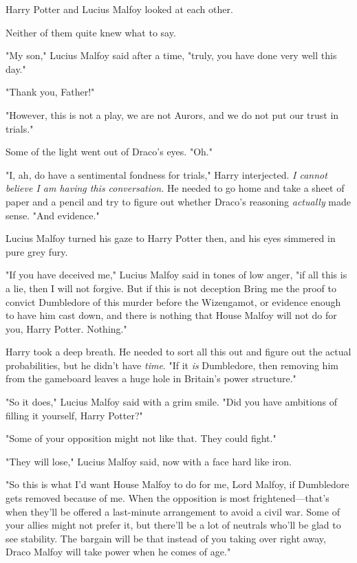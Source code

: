Harry Potter and Lucius Malfoy looked at each other.

Neither of them quite knew what to say.

"My son," Lucius Malfoy said after a time, "truly, you have done very well this
day."

"Thank you, Father!"

"However, this is not a play, we are not Aurors, and we do not put our trust in
trials."

Some of the light went out of Draco's eyes. "Oh."

"I, ah, do have a sentimental fondness for trials," Harry interjected. \emph{I
cannot believe I am having this conversation.} He needed to go home and take a
sheet of paper and a pencil and try to figure out whether Draco's reasoning
\emph{actually} made sense. "And evidence."

Lucius Malfoy turned his gaze to Harry Potter then, and his eyes simmered in
pure grey fury.

"If you have deceived me," Lucius Malfoy said in tones of low anger, "if all
this is a lie, then I will not forgive. But if this is not deception{\el}
Bring me the proof to convict Dumbledore of this murder before the Wizengamot,
or evidence enough to have him cast down, and there is nothing that House
Malfoy will not do for you, Harry Potter. Nothing."

Harry took a deep breath. He needed to sort all this out and figure out the
actual probabilities, but he didn't have \emph{time}. "If it \emph{is}
Dumbledore, then removing him from the gameboard leaves a huge hole in
Britain's power structure."

"So it does," Lucius Malfoy said with a grim smile. "Did you have ambitions of
filling it yourself, Harry Potter?"

"Some of your opposition might not like that. They could fight."

"They will lose," Lucius Malfoy said, now with a face hard like iron.

"So this is what I'd want House Malfoy to do for me, Lord Malfoy, if Dumbledore
gets removed because of me. When the opposition is most frightened---that's
when they'll be offered a last-minute arrangement to avoid a civil war. Some of
your allies might not prefer it, but there'll be a lot of neutrals who'll be
glad to see stability. The bargain will be that instead of you taking over
right away, Draco Malfoy will take power when he comes of age."

